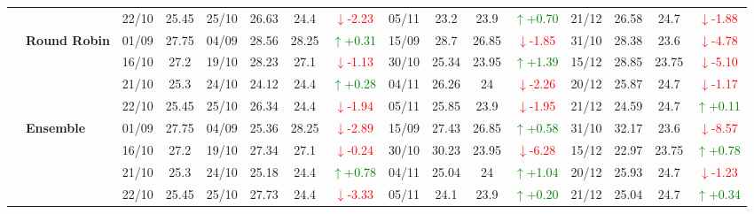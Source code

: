 \documentclass{ieeeaccess}
\begin{document}
{\begin{longtable}{llcc|cccc|cccc|cccc}
&
& 22/10 & 25.45 & 25/10 & 26.63 & 24.4 & \textcolor{red}{\(\downarrow\)-2.23} & 05/11 & 23.2 & 23.9 & \textcolor{green}{\(\uparrow\)+0.70} & 21/12 & 26.58 & 24.7 & \textcolor{red}{\(\downarrow\)-1.88} \\
\cmidrule(lr){2-16}


& \textbf{Round Robin}
& 01/09 & 27.75 & 04/09 & 28.56 & 28.25 & \textcolor{green}{\(\uparrow\)+0.31} & 15/09 & 28.7 & 26.85 & \textcolor{red}{\(\downarrow\)-1.85} & 31/10 & 28.38 & 23.6 & \textcolor{red}{\(\downarrow\)-4.78} \\

&
& 16/10 & 27.2 & 19/10 & 28.23 & 27.1 & \textcolor{red}{\(\downarrow\)-1.13} & 30/10 & 25.34 & 23.95 & \textcolor{green}{\(\uparrow\)+1.39} & 15/12 & 28.85 & 23.75 & \textcolor{red}{\(\downarrow\)-5.10} \\

&
& 21/10 & 25.3 & 24/10 & 24.12 & 24.4 & \textcolor{green}{\(\uparrow\)+0.28} & 04/11 & 26.26 & 24 & \textcolor{red}{\(\downarrow\)-2.26} & 20/12 & 25.87 & 24.7 & \textcolor{red}{\(\downarrow\)-1.17} \\

&
& 22/10 & 25.45 & 25/10 & 26.34 & 24.4 & \textcolor{red}{\(\downarrow\)-1.94} & 05/11 & 25.85 & 23.9 & \textcolor{red}{\(\downarrow\)-1.95} & 21/12 & 24.59 & 24.7 & \textcolor{green}{\(\uparrow\)+0.11} \\
\cmidrule(lr){2-16}



& \textbf{Ensemble}
& 01/09 & 27.75 & 04/09 & 25.36 & 28.25 & \textcolor{red}{\(\downarrow\)-2.89} & 15/09 & 27.43 & 26.85 & \textcolor{green}{\(\uparrow\)+0.58} & 31/10 & 32.17 & 23.6 & \textcolor{red}{\(\downarrow\)-8.57} \\

&
& 16/10 & 27.2 & 19/10 & 27.34 & 27.1 & \textcolor{red}{\(\downarrow\)-0.24} & 30/10 & 30.23 & 23.95 & \textcolor{red}{\(\downarrow\)-6.28} & 15/12 & 22.97 & 23.75 & \textcolor{green}{\(\uparrow\)+0.78} \\

&
& 21/10 & 25.3 & 24/10 & 25.18 & 24.4 & \textcolor{green}{\(\uparrow\)+0.78} & 04/11 & 25.04 & 24 & \textcolor{green}{\(\uparrow\)+1.04} & 20/12 & 25.93 & 24.7 & \textcolor{red}{\(\downarrow\)-1.23} \\

&
& 22/10 & 25.45 & 25/10 & 27.73 & 24.4 & \textcolor{red}{\(\downarrow\)-3.33} & 05/11 & 24.1 & 23.9 & \textcolor{green}{\(\uparrow\)+0.20} & 21/12 & 25.04 & 24.7 & \textcolor{green}{\(\uparrow\)+0.34} \\


\bottomrule
\end{longtable}
}


\EOD
\end{document}
